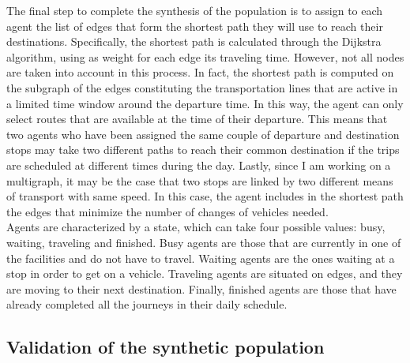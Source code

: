 The final step to complete the synthesis of the population is to assign to each agent the list of edges that form the shortest path they will use to reach their destinations. Specifically, the shortest path is calculated through the Dijkstra algorithm, using as weight for each edge its traveling time. However, not all nodes are taken into account in this process. In fact, the shortest path is computed on the subgraph of the edges constituting the transportation lines that are active in a limited time window around the departure time. In this way, the agent can only select routes that are available at the time of their departure. This means that two agents who have been assigned the same couple of departure and destination stops may take two different paths to reach their common destination if the trips are scheduled at different times during the day. Lastly, since I am working on a multigraph, it may be the case that two stops are linked by two different means of transport with same speed. In this case, the agent includes in the shortest path the edges that minimize the number of changes of vehicles needed. \\


Agents are characterized by a state, which can take four possible values: busy, waiting, traveling and finished. Busy agents are those that are currently in one of the facilities and do not have to travel. Waiting agents are the ones waiting at a stop in order to get on a vehicle. Traveling agents are situated on edges, and they are moving to their next destination. Finally, finished agents are those that have already completed all the journeys in their daily schedule. 


\subsection*{Validation of the synthetic population}\label{ssec:3.3.1}

